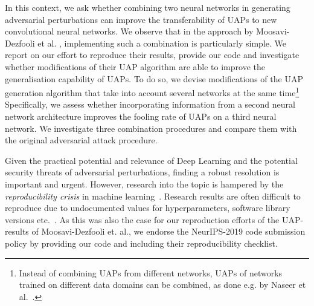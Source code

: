 \documentclass[runningheads]{llncs}
\begin{document}
In this context, we ask whether combining two neural networks in generating adversarial perturbations can improve the transferability of UAPs to new convolutional neural networks. We observe that in the approach by Moosavi-Dezfooli et al. \cite{moosavidezfooli_universal_2017,moosavi-dezfooli_deepfool_2016}, implementing such a combination is particularly simple. 
We report on our effort to reproduce their results, provide our code and investigate whether modifications of their UAP algorithm are able to improve the generalisation capability of UAPs. To do so, we devise modifications of the UAP generation algorithm that take into account several networks at the same time\footnote{Instead of combining UAPs from different networks, UAPs of networks trained on different data domains can be combined, as done e.g. by Naseer et al.~\cite{NIPS2019_9450}.}
Specifically, we assess whether incorporating information from a second neural network architecture improves the fooling rate of UAPs on a third neural network. We investigate three combination procedures and compare them with the original adversarial attack procedure.

Given the practical potential and relevance of Deep Learning and the potential security threats of adversarial perturbations, finding a robust resolution is important and urgent. However, research into the topic is hampered by the \emph{reproducibility crisis} in machine learning~\cite{raff2020quantifying}. Research results are often difficult to reproduce due to undocumented values for hyperparameters, software library versions etc.~\cite{Gundersen2018StateOT}. As this was also the case for our reproduction efforts of the UAP-results of Moosavi-Dezfooli et. al., we endorse the NeurIPS-2019 code submission policy by providing our code and including their reproducibility checklist.

\end{document}
